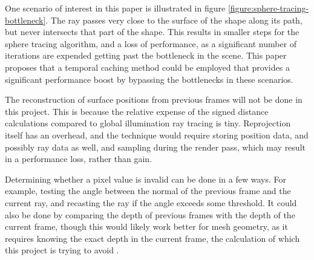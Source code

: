 One scenario of interest in this paper is illustrated in figure \ref{figure:sphere-tracing-bottleneck}. The ray passes very close to the surface of the shape along its path, but never intersects that part of the shape. This results in smaller steps for the sphere tracing algorithm, and a loss of performance, as a significant number of iterations are expended getting past the bottleneck in the scene. This paper proposes that a temporal caching method could be employed that provides a significant performance boost by bypassing the bottlenecks in these scenarios.\newline

The reconstruction of surface positions from previous frames will not be done in this project. This is because the relative expense of the signed distance calculations compared to global illumination ray tracing is tiny. Reprojection itself has an overhead, and the technique would require storing position data, and possibly ray data as well, and sampling during the render pass, which may result in a performance loss, rather than gain.\newline

Determining whether a pixel value is invalid can be done in a few ways. For example, testing the angle between the normal of the previous frame and the current ray, and recasting the ray if the angle exceeds some threshold. It could also be done by comparing the depth of previous frames with the depth of the current frame, though this would likely work better for mesh geometry, as it requires knowing the exact depth in the current frame, the calculation of which this project is trying to avoid \cite{weier2016foveated}.